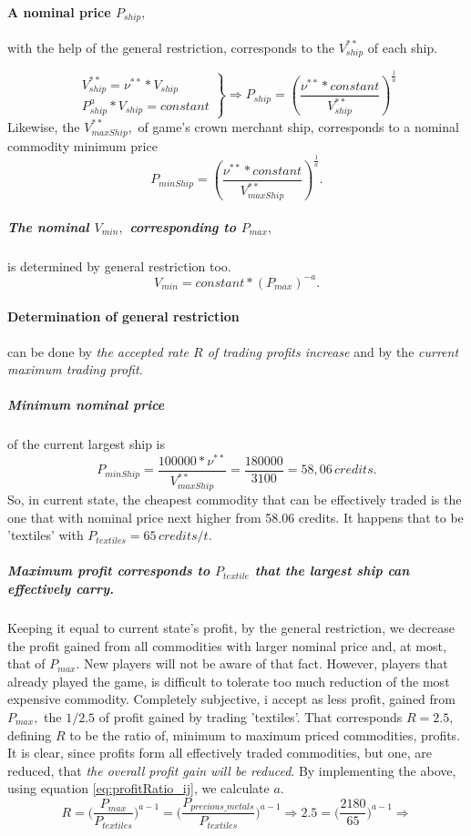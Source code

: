 \documentclass[]{article}
\begin{document}
\paragraph{A nominal  price $P_{ship},$} with the help of the general restriction, corresponds to the $V^{**}_{ship}$ of each ship. 

\[	\left. \substack{
 	V^{**}_{ship}=\nu^{**}*{V_{ship}}\\
 	P^{a}_{ship}*V_{ship}=constant 
}\right\rbrace \Rightarrow P_{ship}=\left( \dfrac{\nu^{**}*constant}{V^{**}_{ship}}\right)^{\frac{1}{a}}
\]
Likewise, the $V^{**}_{maxShip},$ of game's crown merchant ship, corresponds to a nominal commodity minimum price
\begin{equation}\label{eq:Pship}
P_{minShip}=\left( \dfrac{\nu^{**}*constant}{V^{**}_{maxShip}}\right)^{\frac{1}{a}}.
\end{equation}

\subparagraph{The nominal $V_{min},$ corresponding to $P_{max},$} is determined by general restriction too.
\[V_{min}=constant*(P_{max})^{-a}.\]
\paragraph{Determination of general restriction} can be done by \emph{the accepted rate $R$ of trading profits increase} and by the \emph{current maximum trading profit.}
\subparagraph{Minimum nominal price} of the current largest ship is \[P_{minShip}=\dfrac{100000*\nu^{**}}{V^{**}_{maxShip}}=\dfrac{180000}{3100}=58,06\,credits.\] So, in current state, the cheapest commodity that can be effectively traded is the one that with nominal price next higher from 58.06 credits. It happens that to be 'textiles' with $P_{textiles}=65\,credits/t.$ 

\subparagraph*{Maximum profit corresponds to $P_{textile}$ that the largest ship can effectively carry.} Keeping it equal to current state's profit, by the general restriction, we decrease the profit gained from all commodities with larger nominal price and, at most, that of $P_{max}.$ New players will not be aware of that fact. However, players that already played the game, is difficult to tolerate too much reduction of the most expensive commodity. Completely subjective, i accept as less profit, gained from $P_{max},$ the $1/2.5$ of profit gained by trading 'textiles'. That corresponds $R=2.5,$ defining $R$ to be the ratio of, minimum to maximum priced commodities, profits. It is clear, since profits form all effectively traded commodities, but one, are reduced,  that \emph{the overall profit gain will be reduced}. By implementing the above, using equation \eqref{eq:profitRatio_ij}, we calculate $a.$
 \[R=\Big(\dfrac{P_{max}}{P_{textiles}}\Big)^{a-1}=\Big(\dfrac{P_{precious\_metals}}{P_{textiles}}\Big)^{a-1}\Rightarrow 2.5=\Big(\dfrac{2180}{65}\Big)^{a-1}\Rightarrow\]
\end{document}
